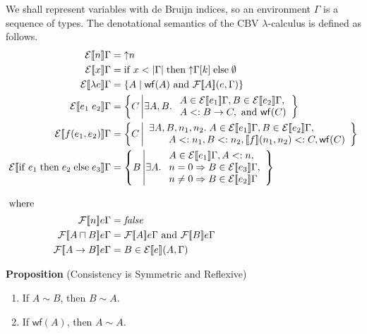 \documentclass{article}
\newcommand{\app}[0]{\;}
\newcommand{\IF}[0]{\mathrm{if}\;}
\newcommand{\THEN}[0]{\;\mathrm{then}\;}
\newcommand{\ELSE}[0]{\;\mathrm{else}\;}
\newcommand{\SEM}[1]{[\![ #1 ]\!]}
\newcommand{\ESEM}[1]{\mathcal{E}\SEM{#1}}
\newcommand{\FSEM}[1]{\mathcal{F}\SEM{#1}}
\newcommand{\WF}[1]{\mathsf{wf}(#1)}
\newcommand{\UP}[1]{\mathord{\uparrow} #1}
\begin{document}
We shall represent variables with de Bruijn indices, so an environment
$\Gamma$ is a sequence of types.  The denotational semantics of the CBV
$\lambda$-calculus is defined as follows.
\begin{align*}
  \ESEM{n}\Gamma &= \UP{n} \\
  \ESEM{x}\Gamma &=  \IF x < |\Gamma| \THEN \UP{\Gamma[k]} \ELSE \emptyset \\
  \ESEM{\lambda e }\Gamma &= \{ A \mid \WF{A} \text{ and } \FSEM{A}(e,\Gamma) \} \\
  \ESEM{e_1\app e_2}\Gamma &= \left\{ C\, \middle| \exists A,B.\;
      \begin{array}{l}
      A \in \ESEM{e_1}\Gamma,
      B \in \ESEM{e_2}\Gamma,\\
      A <: B \to C, \text{ and } \WF{C}
      \end{array}
        \right\} \\
  \ESEM{f(e_1,e_2)}\Gamma &=
      \left\{ C\, \middle| \begin{array}{l}
       \exists A,B,n_1,n_2.\; A \in \ESEM{e_1}\Gamma, B \in \ESEM{e_2}\Gamma,\\
      \qquad A <: n_1, B <: n_2, \SEM{f}(n_1,n_2) <: C, \WF{C} 
      \end{array} \right\} \\
  \ESEM{\IF e_1 \THEN e_2 \ELSE e_3}\Gamma &=
    \left\{ B\, \middle| \exists A.\;
    \begin{array}{l}A \in \ESEM{e_1}\Gamma, A <: n,\\
           n = 0 \Rightarrow B \in \ESEM{e_3}\Gamma,\\
           n \neq 0 \Rightarrow B \in \ESEM{e_2}\Gamma
    \end{array}
    \right\}
    \\[2ex]
    \intertext{where}
   \FSEM{n}e\Gamma &= \mathit{false} \\
   \FSEM{A \sqcap B}e \Gamma &= \FSEM{A}e\Gamma \text{ and } \FSEM{B}e\Gamma\\
   \FSEM{A \to B}e \Gamma &= B \in \ESEM{e} (A, \Gamma)
\end{align*}


\noindent \textbf{Proposition} (Consistency is Symmetric and Reflexive) \\
%
\begin{enumerate}
\item If $A \sim B$, then $B \sim A$.
\item If $\WF{A}$, then $A \sim A$.
\end{enumerate}
\end{document}

